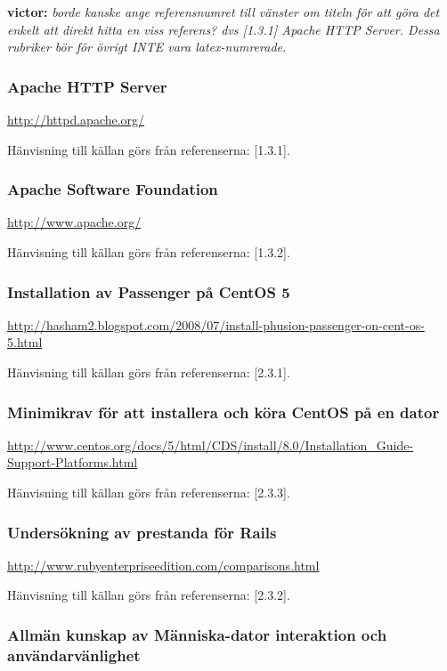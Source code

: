 \documentclass[a4paper, twoside, 11pt, titlepage]{article}
\begin{document}
	\textbf{victor:} \emph{borde kanske ange referensnumret till vänster om titeln för att göra det enkelt att direkt hitta en viss referens? dvs [1.3.1] Apache HTTP Server. Dessa rubriker bör för övrigt INTE vara latex-numrerade.}

		\subsubsection{Apache HTTP Server}


		\url{http://httpd.apache.org/}

		Hänvisning till källan görs från referenserna: [1.3.1].

		\subsubsection{Apache Software Foundation}


		\url{http://www.apache.org/}

		Hänvisning till källan görs från referenserna: [1.3.2].

		\subsubsection{Installation av Passenger på CentOS 5}


		\url{http://hasham2.blogspot.com/2008/07/install-phusion-passenger-on-cent-os-5.html}

		Hänvisning till källan görs från referenserna: [2.3.1].

		\subsubsection{Minimikrav för att installera och köra CentOS på en dator}


		\url{http://www.centos.org/docs/5/html/CDS/install/8.0/Installation_Guide-Support-Platforms.html}

		Hänvisning till källan görs från referenserna: [2.3.3].

		\subsubsection{Undersökning av prestanda för Rails}


		\url{http://www.rubyenterpriseedition.com/comparisons.html}

		Hänvisning till källan görs från referenserna: [2.3.2].

		\subsubsection{Allmän kunskap av Människa-dator interaktion och användarvänlighet}
\end{document}
